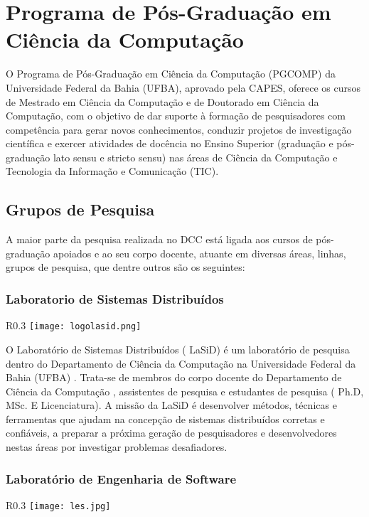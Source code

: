 \section{Programa de Pós-Graduação em Ciência da Computação}

O Programa de Pós-Graduação em Ciência da Computação (PGCOMP) da Universidade Federal da Bahia (UFBA), aprovado pela CAPES, oferece os cursos de Mestrado em Ciência da Computação e de Doutorado em Ciência da Computação, com o objetivo de dar suporte à formação de pesquisadores com competência para gerar novos conhecimentos, conduzir projetos de investigação científica e exercer atividades de docência no Ensino Superior (graduação e pós-graduação lato sensu e stricto sensu) nas áreas de Ciência da Computação e Tecnologia da Informação e Comunicação (TIC).

\subsection{Grupos de Pesquisa}

A maior parte da pesquisa realizada no DCC está ligada aos cursos de pós-graduação apoiados e ao 
    seu corpo docente, atuante em diversas áreas, linhas, grupos de pesquisa, que dentre outros são os seguintes:

\subsubsection{Laboratorio de Sistemas Distribuídos} 
\begin{wrapfigure}{R}{0.3\textwidth}
            \centering
            \texttt{[image: logolasid.png]}
        \end{wrapfigure}  
O Laboratório de Sistemas Distribuídos ( LaSiD) é um laboratório de pesquisa dentro do Departamento de Ciência da Computação na Universidade Federal da Bahia (UFBA) . Trata-se de membros do corpo docente do Departamento de Ciência da Computação , assistentes de pesquisa e estudantes de pesquisa ( Ph.D, MSc. E Licenciatura). A missão da LaSiD é desenvolver métodos, técnicas e ferramentas que ajudam na concepção de sistemas distribuídos corretas e confiáveis, a preparar a próxima geração de pesquisadores e desenvolvedores nestas áreas por investigar problemas desafiadores.
\newline
\newline
\newline
\newline\subsubsection{Laboratório de Engenharia de Software}
\begin{wrapfigure}{R}{0.3\textwidth}
            \centering
            \texttt{[image: les.jpg]}
        \end{wrapfigure}

